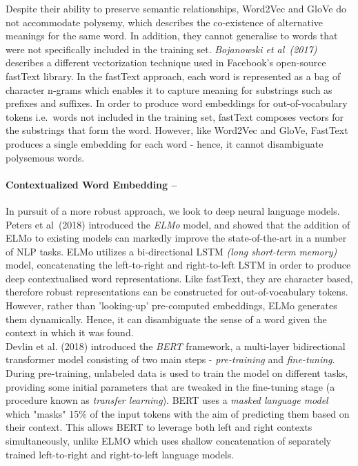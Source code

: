 \documentclass[12pt,a4paper]{article}
\begin{document}
Despite their ability to preserve semantic relationships, Word2Vec and GloVe do not accommodate polysemy, which describes the co-existence of alternative meanings for the same word. In addition, they cannot generalise to words that were not specifically included in the training set. \textit{Bojanowski et al\ (2017)} \cite{bojanowski2016enriching} describes a different vectorization technique used in Facebook's open-source fastText library. In the fastText approach, each word is represented as a bag of character n-grams which enables it to capture meaning for substrings such as prefixes and suffixes. In order to produce word embeddings for out-of-vocabulary tokens i.e.\ words not included in the training set, fastText composes vectors for the substrings that form the word. However, like Word2Vec and GloVe, FastText produces a single embedding for each word - hence, it cannot disambiguate polysemous words.

\paragraph{Contextualized Word Embedding --}
In pursuit of a more robust approach, we look to deep neural language models. Peters et al\ (2018) \cite{peters2018deep} introduced the \textit{ELMo} model, and showed that the addition of ELMo to existing models can markedly improve the state-of-the-art in a number of NLP tasks. ELMo utilizes a bi-directional LSTM \textit{(long short-term memory)} model, concatenating the left-to-right and right-to-left LSTM in order to produce deep contextualised word representations. Like fastText, they are character based, therefore robust representations can be constructed for out-of-vocabulary tokens. However, rather than 'looking-up' pre-computed embeddings, ELMo generates them dynamically. Hence, it can disambiguate the sense of a word given the context in which it was found.\\
Devlin et al. (2018) \cite{devlin2018bert} introduced the \textit{BERT} framework, a multi-layer bidirectional transformer model consisting of two main steps - \textit{pre-training} and \textit{fine-tuning}. During pre-training, unlabeled data is used to train the model on different tasks, providing some initial parameters that are tweaked in the fine-tuning stage (a procedure known as \textit{transfer learning}). BERT uses a \textit{masked language model} which "masks" 15\% of the input tokens with the aim of predicting them based on their context. This allows BERT to leverage both left and right contexts simultaneously, unlike ELMO which uses shallow concatenation of separately trained left-to-right and right-to-left language models. 
\vfill
\end{document}
